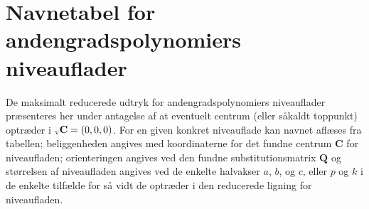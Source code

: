 

\section{Navnetabel for andengradspolynomiers niveauflader} \label{secNavnetabel}

De maksimalt reducerede udtryk for andengradspolynomiers niveauflader præsenteres her under antagelse af at eventuelt centrum (eller såkaldt toppunkt) optræder i ${_\mathrm{v}\mathbf{\mathbf{C}}} = (0,0,0)$. For en given konkret niveauflade kan navnet aflæses fra tabellen; beliggenheden angives med koordinaterne for det fundne centrum $\mathbf{C}$ for niveaufladen;  orienteringen angives ved den fundne substitutionsmatrix $\mathbf{Q}$ og størrelsen af niveaufladen angives ved de enkelte halvakser $a$, $b$, og  $c$, eller $p$ og $k$ i de enkelte tilfælde for så vidt de optræder i den reducerede ligning for niveaufladen.

